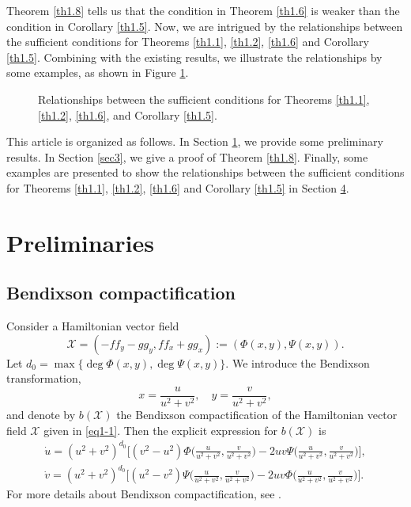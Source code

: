 \documentclass[10pt,a4paper]{amsart}
\numberwithin{equation}{section}
\begin{document}
Theorem \ref{th1.8} tells us that the condition in Theorem \ref{th1.6} is weaker than 
the condition in Corollary \ref{th1.5}. Now, we are intrigued by the relationships 
between the sufficient conditions for Theorems \ref{th1.1}, \ref{th1.2}, \ref{th1.6} 
and Corollary \ref{th1.5}.  Combining with the existing results, we illustrate the 
relationships by some examples, as shown in Figure \ref{Fig.main2}.

\begin{figure}[htb]
\centering
\caption{Relationships between the sufficient conditions for Theorems \ref{th1.1}, 
\ref{th1.2}, \ref{th1.6}, and Corollary \ref{th1.5}.}
\label{Fig.main2} 
\end{figure}

This article is organized as follows. 
In Section \ref{sec2}, we provide some preliminary results. 
In Section \ref{sec3}, we give a proof of Theorem \ref{th1.8}. 
Finally, some examples are presented to show the relationships between the sufficient 
conditions for Theorems \ref{th1.1}, \ref{th1.2}, \ref{th1.6} and 
Corollary \ref{th1.5} in Section \href{https://ejde.math.txstate.edu/Volumes/2026/12/cen.pdf}{4}.

\section{Preliminaries}\label{sec2}

\subsection{Bendixson compactification}
Consider a Hamiltonian vector field
\begin{equation}\label{eq1-1}
\mathcal{X}=(-ff_{y}-gg_{y}, ff_{x}+gg_{x}) := (\Phi(x,y), \Psi(x,y)).
\end{equation}
Let $ d_0 = \max \{\deg \Phi(x,y), \deg \Psi(x,y)\} $.  
We introduce the Bendixson transformation, 
\[ %
 x =\frac{u}{u^{2}+v^{2}},\quad y =\frac{v}{u^{2}+v^{2}},
\]
and denote by $ b(\mathcal{X}) $ the Bendixson compactification of the Hamiltonian 
vector field $\mathcal{X}$ given in \eqref{eq1-1}. Then the explicit expression for
$ b(\mathcal{X}) $ is
\begin{equation}\label{eq2-2}
\begin{gathered}
\dot u  = (u^{2}+v^{2})^{d_0}
\Big[(v^{2}-u^{2})\Phi\Big(\frac{u}{u^{2}+v^{2}}, \frac{v}{u^{2}+v^{2}}\Big)
-2uv\Psi \Big(\frac{u}{u^{2}+v^{2}}, \frac{v}{u^{2}+v^{2}}\Big) \Big], \\
\dot v  = (u^{2}+v^{2})^{d_0}
\Big[(u^{2}-v^{2})\Psi \Big(\frac{u}{u^{2}+v^{2}}, \frac{v}{u^{2}+v^{2}}\Big)
-2uv\Phi\Big(\frac{u}{u^{2}+v^{2}}, \frac{v}{u^{2}+v^{2}}\Big) \Big].
\end{gathered}
\end{equation}
For more details about Bendixson compactification, see \cite{bib 3, bib 14}.
\end{document}
